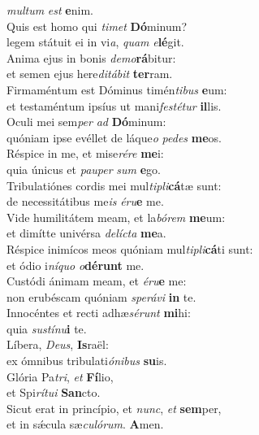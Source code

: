 \evenverse \textit{mul}\textit{tum} \textit{est} \textbf{e}nim.\\
\oddverse Quis est homo qui \textit{ti}\textit{met} \textbf{Dó}minum?~\*\\
\oddverse legem státuit ei in vi\textit{a}, \textit{quam} \textit{e}\textbf{lé}git.\\
\evenverse Anima ejus in bonis \textit{de}\textit{mo}\textbf{rá}bitur:~\*\\
\evenverse et semen ejus here\textit{di}\textit{tá}\textit{bit} \textbf{ter}ram.\\
\oddverse Firmaméntum est Dóminus timén\textit{ti}\textit{bus} \textbf{e}um:~\*\\
\oddverse et testaméntum ipsíus ut mani\textit{fe}\textit{sté}\textit{tur} \textbf{il}lis.\\
\evenverse Oculi mei sem\textit{per} \textit{ad} \textbf{Dó}minum:~\*\\
\evenverse quóniam ipse evéllet de láque\textit{o} \textit{pe}\textit{des} \textbf{me}os.\\
\oddverse Réspice in me, et mise\textit{ré}\textit{re} \textbf{me}i:~\*\\
\oddverse quia únicus et \textit{pau}\textit{per} \textit{sum} \textbf{e}go.\\
\evenverse Tribulatiónes cordis mei mul\textit{ti}\textit{pli}\textbf{cá}tæ sunt:~\*\\
\evenverse de necessitátibus me\textit{is} \textit{é}\textit{ru}\textbf{e} me.\\
\oddverse Vide humilitátem meam, et la\textit{bó}\textit{rem} \textbf{me}um:~\*\\
\oddverse et dimítte univérsa \textit{de}\textit{lí}\textit{cta} \textbf{me}a.\\
\evenverse Réspice inimícos meos quóniam mul\textit{ti}\textit{pli}\textbf{cá}ti sunt:~\*\\
\evenverse et ódio i\textit{ní}\textit{quo} \textit{o}\textbf{dé}\textbf{runt} me.\\
\oddverse Custódi ánimam meam, et \textit{é}\textit{ru}\textbf{e} me:~\*\\
\oddverse non erubéscam quóniam \textit{spe}\textit{rá}\textit{vi} \textbf{in} te.\\
\evenverse Innocéntes et recti adhæ\textit{sé}\textit{runt} \textbf{mi}hi:~\*\\
\evenverse quia \textit{su}\textit{stí}\textit{nu}\textbf{i} te.\\
\oddverse Líbera, \textit{De}\textit{us}, \textbf{Is}raël:~\*\\
\oddverse ex ómnibus tribulati\textit{ó}\textit{ni}\textit{bus} \textbf{su}is.\\
\evenverse Glória Pa\textit{tri}, \textit{et} \textbf{Fí}lio,~\*\\
\evenverse et Spi\textit{rí}\textit{tu}\textit{i} \textbf{San}cto.\\
\oddverse Sicut erat in princípio, et \textit{nunc}, \textit{et} \textbf{sem}per,~\*\\
\oddverse et in sǽcula sæ\textit{cu}\textit{ló}\textit{rum}. \textbf{A}men.\\
